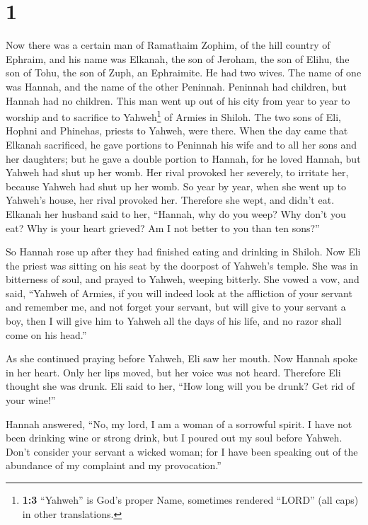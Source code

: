 \hypertarget{section}{%
\section{1}\label{section}}

 Now there was a certain man of Ramathaim Zophim, of the
hill country of Ephraim, and his name was Elkanah, the son of Jeroham,
the son of Elihu, the son of Tohu, the son of Zuph, an Ephraimite.
 He had two wives. The name of one was Hannah, and the
name of the other Peninnah. Peninnah had children, but Hannah had no
children.  This man went up out of his city from year to
year to worship and to sacrifice to Yahweh\footnote{\textbf{1:3}
  ``Yahweh'' is God's proper Name, sometimes rendered ``LORD'' (all
  caps) in other translations.} of Armies in Shiloh. The two sons of
Eli, Hophni and Phinehas, priests to Yahweh, were there. 
When the day came that Elkanah sacrificed, he gave portions to Peninnah
his wife and to all her sons and her daughters;  but he
gave a double portion to Hannah, for he loved Hannah, but Yahweh had
shut up her womb.  Her rival provoked her severely, to
irritate her, because Yahweh had shut up her womb.  So
year by year, when she went up to Yahweh's house, her rival provoked
her. Therefore she wept, and didn't eat.  Elkanah her
husband said to her, ``Hannah, why do you weep? Why don't you eat? Why
is your heart grieved? Am I not better to you than ten sons?''

 So Hannah rose up after they had finished eating and
drinking in Shiloh. Now Eli the priest was sitting on his seat by the
doorpost of Yahweh's temple.  She was in bitterness of
soul, and prayed to Yahweh, weeping bitterly.  She vowed
a vow, and said, ``Yahweh of Armies, if you will indeed look at the
affliction of your servant and remember me, and not forget your servant,
but will give to your servant a boy, then I will give him to Yahweh all
the days of his life, and no razor shall come on his head.''

 As she continued praying before Yahweh, Eli saw her
mouth.  Now Hannah spoke in her heart. Only her lips
moved, but her voice was not heard. Therefore Eli thought she was drunk.
 Eli said to her, ``How long will you be drunk? Get rid
of your wine!''

 Hannah answered, ``No, my lord, I am a woman of a
sorrowful spirit. I have not been drinking wine or strong drink, but I
poured out my soul before Yahweh.  Don't consider your
servant a wicked woman; for I have been speaking out of the abundance of
my complaint and my provocation.''

